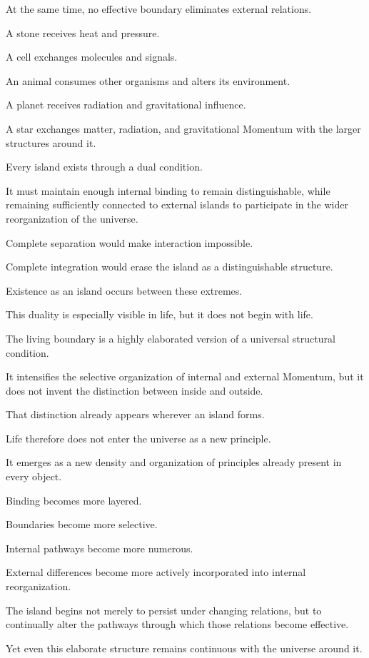 At the same time, no effective boundary eliminates external relations.

A stone receives heat and pressure.

A cell exchanges molecules and signals.

An animal consumes other organisms and alters its environment.

A planet receives radiation and gravitational influence.

A star exchanges matter, radiation, and gravitational Momentum with the larger structures around it.

Every island exists through a dual condition.

It must maintain enough internal binding to remain distinguishable, while remaining sufficiently connected to external islands to participate in the wider reorganization of the universe.

Complete separation would make interaction impossible.

Complete integration would erase the island as a distinguishable structure.

Existence as an island occurs between these extremes.

This duality is especially visible in life, but it does not begin with life.

The living boundary is a highly elaborated version of a universal structural condition.

It intensifies the selective organization of internal and external Momentum, but it does not invent the distinction between inside and outside.

That distinction already appears wherever an island forms.

Life therefore does not enter the universe as a new principle.

It emerges as a new density and organization of principles already present in every object.

Binding becomes more layered.

Boundaries become more selective.

Internal pathways become more numerous.

External differences become more actively incorporated into internal reorganization.

The island begins not merely to persist under changing relations, but to continually alter the pathways through which those relations become effective.

Yet even this elaborate structure remains continuous with the universe around it.


